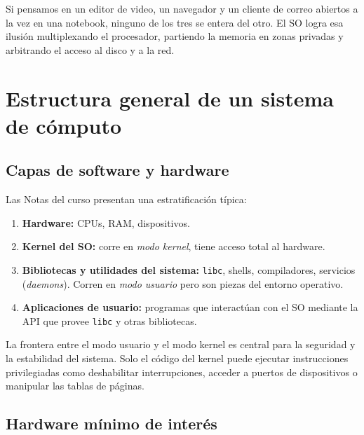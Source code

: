 \documentclass[11pt,a4paper]{article}
\begin{document}
\begin{idea}
Si pensamos en un editor de video, un navegador y un cliente de correo
abiertos a la vez en una notebook, ninguno de los tres se entera del
otro. El SO logra esa ilusión multiplexando el procesador, partiendo la
memoria en zonas privadas y arbitrando el acceso al disco y a la red.
\end{idea}

\section{Estructura general de un sistema de cómputo}

\subsection{Capas de software y hardware}

Las Notas del curso presentan una estratificación típica:

\begin{enumerate}[leftmargin=*]
    \item \textbf{Hardware:} CPUs, RAM, dispositivos.
    \item \textbf{Kernel del SO:} corre en \emph{modo kernel}, tiene
        acceso total al hardware.
    \item \textbf{Bibliotecas y utilidades del sistema:} \texttt{libc},
        shells, compiladores, servicios (\emph{daemons}). Corren en
        \emph{modo usuario} pero son piezas del entorno operativo.
    \item \textbf{Aplicaciones de usuario:} programas que interactúan con
        el SO mediante la API que provee \texttt{libc} y otras
        bibliotecas.
\end{enumerate}

La frontera entre el modo usuario y el modo kernel es central para la
seguridad y la estabilidad del sistema. Solo el código del kernel puede
ejecutar instrucciones privilegiadas como deshabilitar interrupciones,
acceder a puertos de dispositivos o manipular las tablas de páginas.

\subsection{Hardware mínimo de interés}
\end{document}
